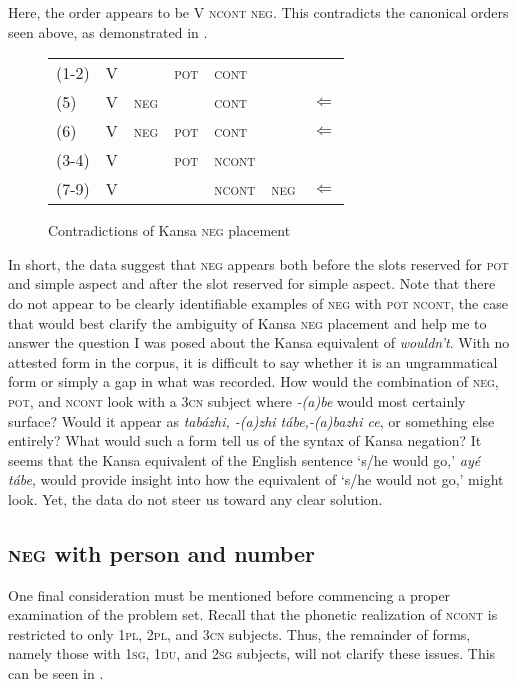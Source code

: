 \documentclass[output=paper]{LSP/langsci}
\begin{document}
Here, the order appears to be V \textsc{ncont neg}. This contradicts the canonical orders seen above, as demonstrated in .

\begin{figure}
\caption{Contradictions of Kansa \textsc{neg} placement} \label{contradictions}
\begin{tabular}{ l l l l l l l }
(1-2) & V & & \textsc{pot} & \textsc{cont} & & \\
(5) & V & \textsc{neg} & & \textsc{cont} & & $\Leftarrow$ \\
(6) & V & \textsc{neg} & \textsc{pot} & \textsc{cont} & & $\Leftarrow$ \\
(3-4) & V & & \textsc{pot} & \textsc{ncont} & & \\
(7-9) & V & & & \textsc{ncont} & \textsc{neg} & $\Leftarrow$ \\
\end{tabular}
\end{figure}

In short, the data suggest that \textsc{neg} appears both before the slots reserved for \textsc{pot} and simple aspect and after the slot reserved for simple aspect. Note that there do not appear to be clearly identifiable examples of \textsc{neg} with \textsc{pot ncont}, the case that would best clarify the ambiguity of Kansa \textsc{neg} placement and help me to answer the question I was posed about the Kansa equivalent of \textit{wouldn't}. With no attested form in the corpus, it is difficult to say whether it is an ungrammatical form or simply a gap in what was recorded. How would the combination of \textsc{neg}, \textsc{pot}, and \textsc{ncont} look with a \textsc{3cn} subject where \textit{-(a)be} would most certainly surface? Would it appear as \textit{tab\'azhi, -(a)zhi t\'abe,-(a)bazhi ce}, or something else entirely? What would such a form tell us of the syntax of Kansa negation? It seems that the Kansa equivalent of the English sentence `s/he would go,' \textit{ay\'e t\'abe}, would provide insight into how the equivalent of `s/he would not go,' might look. Yet, the data do not steer us toward any clear solution.

\subsection{\textsc{neg} with person and number}
One final consideration must be mentioned before commencing a proper examination of the problem set. Recall that the phonetic realization of \textsc{ncont} is restricted to only \textsc{1pl, 2pl}, and \textsc{3cn} subjects. Thus, the remainder of forms, namely those with \textsc{1sg, 1du}, and \textsc{2sg} subjects, will not clarify these issues. This can be seen in .
\end{document}
